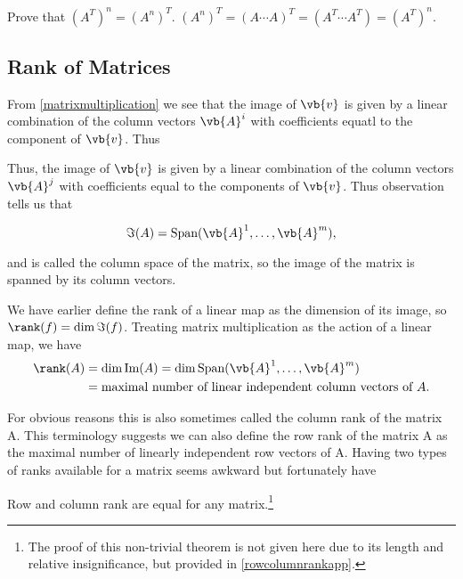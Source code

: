 \documentclass[a4paper,12pt]{report}
\begin{document}
{Prove that \((A^T)^{n} = (A^{n} )^T\).}
{\((A^{n} )^{T} = (A \cdots A)^{T} = (A^{T} \cdots A^{T}  ) = (A^{T} )^{n}\). } 


\subsection{Rank of Matrices}

From \cref{matrixmultiplication} we see that the image of \(\vb{v} \) is given by a linear combination of the column vectors \(\vb{A} ^{i}\) with coefficients equatl to the component of \(\vb{v} \). Thus    

Thus, the image of \(\vb{v} \) is given by a linear combination of the column vectors \(\vb{A} ^{j} \) with coefficients equal to the components of \(\vb{v} \). Thus observation tells us that 

\begin{equation}
    \Im (A) = \text{Span}(\vb{A} ^{1} , \ldots , \vb{A} ^{m} ), 
\end{equation}

and is called the column space of the matrix, so the image of the matrix is spanned by its column vectors.

We have earlier define the rank of a linear map as the dimension of its image, so \(\rank (f) = \dim \Im(f)\). Treating matrix multiplication as the action of a linear map, we have 
\begin{equation}
    \begin{aligned}
        \rank (A) &= \dim \text{Im}(A) = \dim \text{Span} (\vb{A} ^{1}, \ldots ,\vb{A} ^{m}  ) \\
        &= \text{maximal number of linear independent column vectors of \(A\)}.
    \end{aligned}
\end{equation}

For obvious reasons this is also sometimes called the column rank of the matrix A. This terminology suggests we can also define the row rank of the matrix A as the maximal number of linearly independent row vectors of A. Having two types of ranks available for a matrix seems awkward but fortunately have

\begin{theorem}\label{rowcolumnrank} 
Row and column rank are equal for any matrix.\footnote{The proof of this non-trivial theorem is not given here due to its length and relative insignificance, but provided in \cref{rowcolumnrankapp}.}
\end{theorem}
\end{document}
